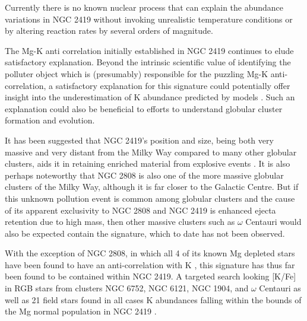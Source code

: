 \documentclass[a4paper,fleqn,usenatbib]{mnras}
\begin{document}
Currently there is no known nuclear process that can explain the abundance variations in NGC 2419 without invoking unrealistic temperature conditions or by altering reaction rates by several orders of magnitude. 





The Mg-K anti correlation initially established in NGC 2419 continues to elude satisfactory explanation. Beyond the intrinsic scientific value of identifying the polluter object which is (presumably) responsible for the puzzling Mg-K anti-correlation, a satisfactory explanation for this signature could potentially offer insight into the underestimation of K abundance predicted by models \citep{kobayashi2011}. Such an explanation could also be beneficial to efforts to understand globular cluster formation and evolution.




It has been suggested that NGC 2419's position and size, being both very massive and very distant from the Milky Way compared to many other globular clusters, aids it in retaining enriched material from explosive events \citep{mucciarelli2012}. It is also perhaps noteworthy that NGC 2808 is also one of the more massive globular clusters of the Milky Way, although it is far closer to the Galactic Centre. But if this unknown pollution event is common among globular clusters and the cause of its apparent exclusivity to NGC 2808 and NGC 2419 is enhanced ejecta retention due to high mass, then other massive clusters such as $\omega$ Centauri would also be expected contain the signature, which to date has not been observed.


With the exception of NGC 2808, in which all 4 of its known Mg depleted stars have been found to have an anti-correlation with K \citep{mucciarelli2015}, this signature has thus far been found to be contained within NGC 2419. A  targeted search looking [K/Fe] in RGB stars from clusters NGC 6752, NGC 6121, NGC 1904, and $\omega$ Centauri as well as 21 field stars found in all cases K abundances falling within the bounds of the Mg normal population in NGC 2419 \citep{carretta2013}.
\end{document}
